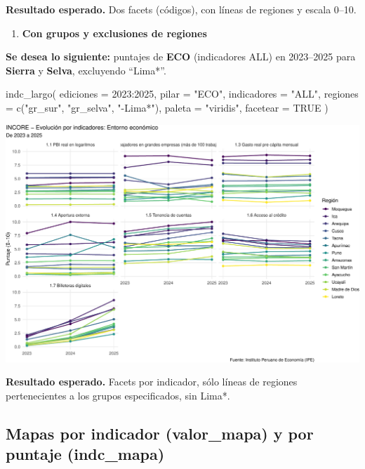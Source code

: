 \documentclass[
  11pt,
  letterpaper,
  DIV=11,
  numbers=noendperiod]{scrartcl}
\newenvironment{Shaded}{\begin{snugshade}}{\end{snugshade}}
\newcommand{\AttributeTok}[1]{\textcolor[rgb]{0.40,0.45,0.13}{#1}}
\newcommand{\ConstantTok}[1]{\textcolor[rgb]{0.56,0.35,0.01}{#1}}
\newcommand{\DecValTok}[1]{\textcolor[rgb]{0.68,0.00,0.00}{#1}}
\newcommand{\FunctionTok}[1]{\textcolor[rgb]{0.28,0.35,0.67}{#1}}
\newcommand{\NormalTok}[1]{\textcolor[rgb]{0.00,0.23,0.31}{#1}}
\newcommand{\SpecialCharTok}[1]{\textcolor[rgb]{0.37,0.37,0.37}{#1}}
\newcommand{\StringTok}[1]{\textcolor[rgb]{0.13,0.47,0.30}{#1}}
\providecommand{\tightlist}{%
  \setlength{\itemsep}{0pt}\setlength{\parskip}{0pt}}\usepackage{longtable,booktabs,array}
\begin{document}
\textbf{Resultado esperado.} Dos facets (códigos), con líneas de
regiones y escala 0--10.

\begin{enumerate}
\def\labelenumi{\arabic{enumi}.}
\setcounter{enumi}{2}
\tightlist
\item
  \textbf{Con grupos y exclusiones de regiones}
\end{enumerate}

\textbf{Se desea lo siguiente:} puntajes de \textbf{ECO} (indicadores
ALL) en 2023--2025 para \textbf{Sierra} y \textbf{Selva}, excluyendo
``Lima*''.

\begin{Shaded}
\begin{Highlighting}[]
\FunctionTok{indc\_largo}\NormalTok{(}
  \AttributeTok{ediciones   =} \DecValTok{2023}\SpecialCharTok{:}\DecValTok{2025}\NormalTok{,}
  \AttributeTok{pilar       =} \StringTok{"ECO"}\NormalTok{,}
  \AttributeTok{indicadores =} \StringTok{"ALL"}\NormalTok{,}
  \AttributeTok{regiones    =} \FunctionTok{c}\NormalTok{(}\StringTok{"gr\_sur"}\NormalTok{, }\StringTok{"gr\_selva"}\NormalTok{, }\StringTok{"{-}Lima*"}\NormalTok{),}
  \AttributeTok{paleta      =} \StringTok{"viridis"}\NormalTok{,}
  \AttributeTok{facetear    =} \ConstantTok{TRUE}
\NormalTok{)}
\end{Highlighting}
\end{Shaded}

\includegraphics{Manual_files/figure-pdf/unnamed-chunk-83-1.pdf}

\textbf{Resultado esperado.} Facets por indicador, sólo líneas de
regiones pertenecientes a los grupos especificados, sin Lima*.

\subsection{\texorpdfstring{\textbf{Mapas por indicador (valor\_mapa) y
por puntaje
(indc\_mapa)}}{Mapas por indicador (valor\_mapa) y por puntaje (indc\_mapa)}}\label{mapas-por-indicador-valor_mapa-y-por-puntaje-indc_mapa}
\end{document}

